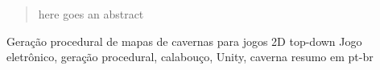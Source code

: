 

\begin{abstract}
here goes an abstract
\end{abstract}

\begin{englishabstract}
{Geração procedural de mapas de cavernas para jogos 2D top-down}
{Jogo eletrônico, geração procedural, calabouço, Unity, caverna}
resumo em pt-br
\end{englishabstract}



